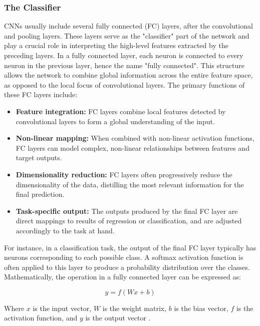 \subsubsection{The Classifier}
CNNs usually include several fully connected (FC) layers, after the convolutional and pooling layers. These layers serve as the "classifier" part of the network and play a crucial role in interpreting the high-level features extracted by the preceding layers.
In a fully connected layer, each neuron is connected to every neuron in the previous layer, hence the name "fully connected". This structure allows the network to combine global information across the entire feature space, as opposed to the local focus of convolutional layers.
The primary functions of these FC layers include:
\begin{itemize}
\item \textbf{Feature integration:} FC layers combine local features detected by convolutional layers to form a global understanding of the input.
\item \textbf{Non-linear mapping:} When combined with non-linear activation functions, FC layers can model complex, non-linear relationships between features and target outputs.
\item \textbf{Dimensionality reduction:} FC layers often progressively reduce the dimensionality of the data, distilling the most relevant information for the final prediction.
\item \textbf{Task-specific output:} The outputs produced by the final FC layer are direct mappings to results of regression or classification, and are adjusted accordingly to the task at hand.
\end{itemize}
For instance, in a classification task, the output of the final FC layer typically has neurons corresponding to each possible class. A softmax activation function \cite{Softmax} is often applied to this layer to produce a probability distribution over the classes.
Mathematically, the operation in a fully connected layer can be expressed as:

\[
y = f(Wx + b)
\]

Where $x$ is the input vector, $W$ is the weight matrix, $b$ is the bias vector, $f$ is the activation function, and $y$ is the output vector \cite{Klein}.


